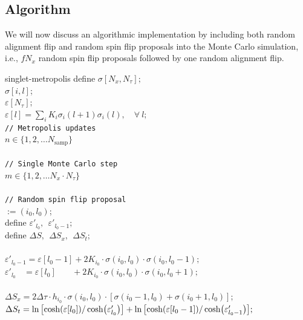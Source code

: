 \documentclass[../thesis_main.tex]{subfiles}
\begin{document}
\subsection{Algorithm}
We will now discuss an algorithmic implementation by including both random alignment flip and random spin flip proposals into the Monte Carlo simulation, i.e., ${f N_x}$  random spin flip proposals followed by one random alignment flip.

\begin{algorithm}{singlet-metropolis}
    \> define $\sigma[N_x ,N_\tau];$ \\
    \>  $\sigma[i, l]$;\\
    \>  $\varepsilon[N_\tau];$ \\
    \>  $\varepsilon[l] = \sum_i K_i \sigma_i(l+1) \sigma_i(l), \quad\forall\: l;$ \\
    \> \texttt{// Metropolis updates} \\
     $n \in \{1, 2, \ldots N_\text{samp}\}$ \\
    \\
    \>\> \texttt{// Single Monte Carlo step} \\
    \> $m \in \{1, 2, \ldots N_x \cdot N_\tau \}$ \\
    \>\\
    \>\>\> \texttt{// Random spin flip proposal} \\
    \>\>\> $:=(i_0, l_0)$;\\
    \>\>\> define $\varepsilon'_{l_0}, \:\:
    \varepsilon'_{l_0 - 1}; $\\
    \>\>\> define $\Delta S, \:\: \Delta S_x, \:\: \Delta S_t;$\\
    \\
    \>\>\> $\varepsilon'_{l_0-1} = \varepsilon[l_0-1] + 2K_{i_0}\cdot\sigma(i_0, l_0)\cdot\sigma(i_0, l_0-1);$\\
    \>\>\> $\varepsilon'_{l_0}\:\:\:\: = \varepsilon[l_0] \:\:\:\:\quad + 2K_{i_0}\cdot\sigma(i_0, l_0)\cdot\sigma(i_0, l_0+1);$\\
    \\
    \>\>\> $\Delta S_x = 2\Delta \tau \cdot h_{i_0} \cdot \sigma(i_0, l_0) \cdot [\sigma(i_0-1,l_0) + \sigma(i_0+1,l_0)];$ \\
    \>\>\> $\Delta S_t = \ln \qty[\cosh(\varepsilon[l_0])/\cosh(\varepsilon'_{l_0})] + \ln\qty[\cosh(\varepsilon[l_0-1])/\cosh(\varepsilon'_{l_0-1})] ;$ \\

\end{algorithm}
\end{document}
